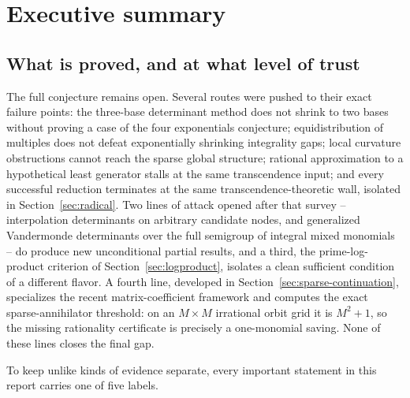\documentclass[11pt,oneside]{article}
\theoremstyle{definition}
\theoremstyle{remark}
\begin{document}
\tableofcontents
\clearpage
{}
\section{Executive summary}
\label{sec:executive}

\subsection{What is proved, and at what level of trust}
\label{ex:trust}

The full conjecture remains open.  Several routes were pushed to their exact failure points:
the three-base determinant method does not shrink to two bases without proving a case of the
four exponentials conjecture; equidistribution of multiples does not defeat exponentially
shrinking integrality gaps; local curvature obstructions cannot reach the sparse global
structure; rational approximation to a hypothetical least generator stalls at the same
transcendence input; and every successful reduction terminates at the same
transcendence-theoretic wall, isolated in Section~\ref{sec:radical}.  Two lines of attack
opened after that survey -- interpolation determinants on arbitrary candidate nodes, and
generalized Vandermonde determinants over the full semigroup of integral mixed monomials --
do produce new unconditional partial results, and a third, the prime-log-product criterion of
Section~\ref{sec:logproduct}, isolates a clean sufficient condition of a different flavor.
A fourth line, developed in Section~\ref{sec:sparse-continuation}, specializes the recent
matrix-coefficient framework and computes the exact sparse-annihilator threshold: on an
$M\times M$ irrational orbit grid it is $M^2+1$, so the missing rationality certificate is
precisely a one-monomial saving.  None of these lines closes the final gap.

To keep unlike kinds of evidence separate, every important statement in this report carries
one of five labels.
\end{document}
